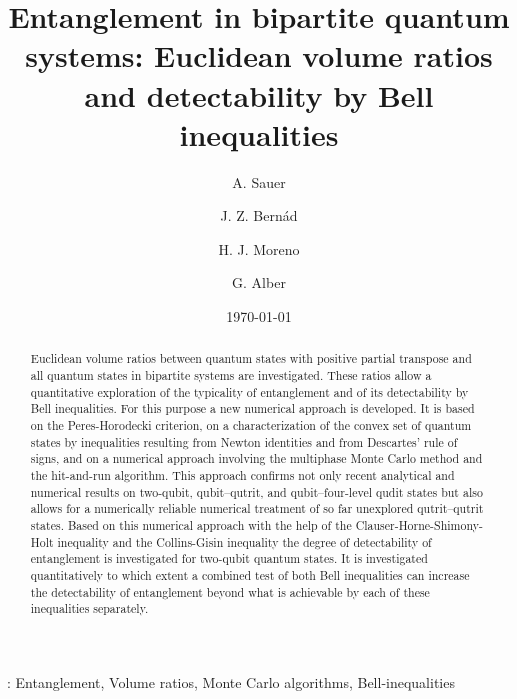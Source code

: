 \documentclass[12pt]{iopart}
\begin{document}
\title[]{Entanglement in bipartite quantum systems: Euclidean volume ratios and detectability by Bell inequalities}

\author{A. Sauer}
\address{Institut f\"{u}r Angewandte Physik, Technische Universit\"{a}t
Darmstadt, D-64289 Darmstadt, Germany}

\author{J. Z. Bern\'ad}
\address{Peter Gr\"unberg Institute (PGI-8), Forschungszentrum J\"ulich, D-52425
J\"ulich, Germany}
\address{Institut f\"{u}r Angewandte Physik, Technische Universit\"{a}t
Darmstadt, D-64289 Darmstadt, Germany}

\author{H. J. Moreno}
\address{Institut f\"{u}r Angewandte Physik, Technische Universit\"{a}t
Darmstadt, D-64289 Darmstadt, Germany}

\author{G. Alber}
\address{Institut f\"{u}r Angewandte Physik, Technische Universit\"{a}t
Darmstadt, D-64289 Darmstadt, Germany}

\date{\today}


\begin{abstract}
Euclidean volume ratios between quantum states with positive partial transpose and all quantum states in bipartite systems are investigated. 
These ratios allow a quantitative exploration of the typicality of entanglement and of its detectability by Bell inequalities.
For this purpose a new numerical approach is developed. 
It is based on the Peres-Horodecki criterion, on a characterization of the convex set of quantum states by inequalities resulting from Newton identities and from Descartes' rule of signs, and on a numerical 
approach involving the multiphase  Monte Carlo method and the hit-and-run algorithm. This approach confirms not only recent analytical and numerical results on two-qubit, qubit--qutrit, and qubit--four-level qudit states 
but also allows for a numerically reliable numerical treatment of so far unexplored qutrit--qutrit states. Based on this numerical approach with the help of the 
Clauser-Horne-Shimony-Holt inequality and the
Collins-Gisin inequality the degree of detectability of entanglement is investigated for two-qubit quantum states. 
It is investigated quantitatively to which extent a combined test of both Bell inequalities can increase the detectability of entanglement beyond what is achievable by each of these inequalities separately.
\end{abstract}
\vspace{2pc}
: Entanglement, Volume ratios, Monte Carlo algorithms, Bell-inequalities
\end{document}

